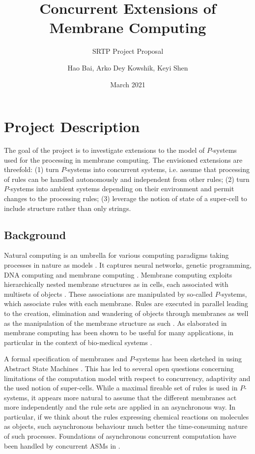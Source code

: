 \documentclass[11pt]{llncs}
\title{Concurrent Extensions of Membrane Computing}
\subtitle{SRTP Project Proposal}
\author{Hao Bai, Arko Dey Kowshik, Keyi Shen}
\institute{Zhejiang University, UIUC Institute}
\date{March 2021}
\begin{document}
\maketitle

\section{Project Description}

The goal of the project is to investigate extensions to the model of $P$-systems used for the processing in membrane computing. The envisioned extensions are threefold: (1) turn $P$-systems into concurrent systems, i.e. assume that processing of rules can be handled autonomously and independent from other rules; (2) turn $P$-systems into ambient systems depending on their environment and permit changes to the processing rules; (3) leverage the notion of state of a super-cell to include structure rather than only strings.

\subsection{Background}

Natural computing is an umbrella for various computing paradigms taking processes in nature as models \cite{paun:1998}. It captures neural networks, genetic programming, DNA computing and membrane computing \cite{paun:2002}. Membrane computing exploits hierarchically nested membrane structures as in cells, each associated with multisets of objects \cite{paun:ecss2009}. These associations are manipulated by so-called $P$-systems, which associate rules with each membrane. Rules are executed in parallel leading to the creation, elimination and wandering of objects through membranes as well as the manipulation of the membrane structure as such \cite{paun:csjm2001}. As elaborated in \cite{paun:2002} membrane computing has been shown to be useful for many applications, in particular in the context of bio-medical systems \cite{petre:jucs1999}.

A formal specification of membranes and $P$-systems has been sketched in \cite{schewe:abz2018} using Abstract State Machines \cite{boerger:2003}. This has led to several open questions concerning limitations of the computation model with respect to concurrency, adaptivity and the used notion of super-cells. While a maximal fireable set of rules is used in $P$-systems, it appears more natural to assume that the different membranes act more independently and the rule sets are applied in an asynchronous way. In particular, if we think about the rules expressing chemical reactions on molecules as objects, such asynchronous behaviour much better the time-consuming nature of such processes. Foundations of asynchronous concurrent computation have been handled by concurrent ASMs in \cite{boerger:ai2016}.
\end{document}
